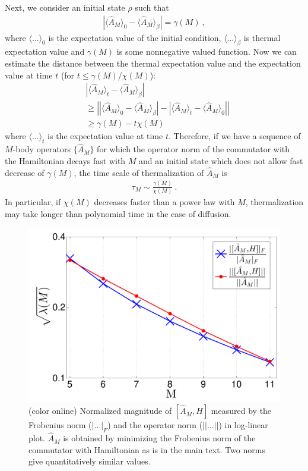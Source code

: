 \documentclass[twocolumn,superscriptaddress, prl,showpacs]{revtex4-1}
\begin{document}
Next, we consider an initial state $\rho$ such that
\begin{align}
|\langle \hat{A}_M \rangle_0 - \langle \hat{A}_M \rangle_\beta| = \gamma(M) ~,
\end{align}
where $\langle \ldots \rangle_0$ is the expectation value of the initial condition, $\langle \ldots \rangle_\beta$
is thermal expectation value and $\gamma(M)$ is some nonnegative valued function.
Now we can estimate the distance between the thermal expectation value and the expectation value at time $t$ (for $t \leq \gamma(M)/\chi(M)$):
\begin{align}
&|\langle \hat{A}_M \rangle_t - \langle \hat{A}_M \rangle_\beta| \nonumber\\
&\geq \left | |\langle \hat{A}_M\rangle_0 - \langle \hat{A}_M\rangle_\beta | -|\langle \hat{A}_M\rangle_t - \langle \hat{A}_M\rangle_0 |\right | \nonumber\\
&\geq \gamma(M) - t \chi(M)
\end{align}
where $\langle \ldots \rangle_t$ is the expectation value at time $t$.
Therefore, if we have a sequence of $M$-body operators $\{ \hat{A}_M \}$
for which the operator norm of the commutator with the Hamiltonian decays fast with $M$
and an initial state which does not allow fast decrease of $\gamma(M)$,
the time scale of thermalization of $\hat{A}_M$ is
\begin{align}
\tau_M \sim \frac{\gamma(M)}{\chi(M)} ~.
\end{align}
In particular, if $\chi(M)$ decreases faster than a power law with $M$,
thermalization may take longer than polynomial time in the case of diffusion.



\begin{figure}
\includegraphics[width=1.0\linewidth]{infinite_ham_opnorm_modified.pdf}
\centering
\caption{(color online) Normalized magnitude of $[\hat{A}_M, H]$ measured by the Frobenius norm ($|\ldots|_F$) and the operator norm ($||\ldots||$)
in log-linear plot.
$\hat{A}_M$ is obtained by minimizing the Frobenius norm of the commutator with Hamiltonian as is in the main text.
Two norms give quantitatively similar values.
}
\label{fig:op_norm}
\end{figure}
\end{document}
